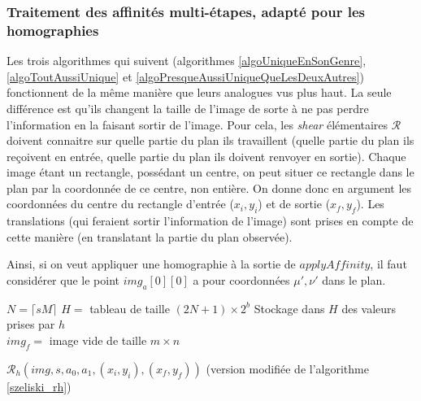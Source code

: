   \subsubsection{Traitement des affinités multi-étapes, adapté pour les homographies}
  Les trois algorithmes qui suivent (algorithmes \ref{algoUniqueEnSonGenre}, \ref{algoToutAussiUnique} et \ref{algoPresqueAussiUniqueQueLesDeuxAutres}) fonctionnent de la même manière que leurs analogues vus plus haut. La seule différence est qu'ils changent la taille de l'image de sorte à ne pas perdre l'information en la faisant sortir de l'image. Pour cela, les \emph{shear} élémentaires $\mathcal R$ doivent connaitre sur quelle partie du plan ils travaillent (quelle partie du plan ils reçoivent en entrée, quelle partie du plan ils doivent renvoyer en sortie). Chaque image étant un rectangle, possédant un centre, on peut situer ce rectangle dans le plan par la coordonnée de ce centre, non entière. On donne donc en argument les coordonnées du centre du rectangle d'entrée ($x_i,y_i$) et de sortie ($x_f,y_f$). Les translations (qui feraient sortir l'information de l'image) sont prises en compte de cette manière (en translatant la partie du plan observée).
  
  Ainsi, si on veut appliquer une homographie à la sortie de $applyAffinity$, il faut considérer que le point $img_a[0][0]$ a pour coordonnées $\mu',\nu'$ dans le plan.
  
   \begin{algorithme}
    $N = \lceil sM \rceil$\;
    $H = $ tableau de taille $(2N+1) \times 2^b$\;
    Stockage dans $H$ des valeurs prises par $h$\;\ \\
    $img_f = $ image vide de taille $m \times n$\;
    \caption{$\mathcal{R}_h(img,s,a_0,a_1,(x_i,y_i),(x_f,y_f))$ (version modifiée de l'algorithme \ref{szeliski_rh})}
    \label{algoUniqueEnSonGenre}
   \end{algorithme}











